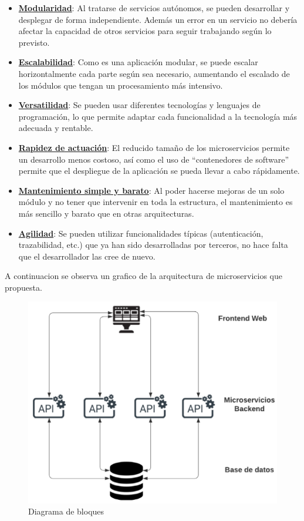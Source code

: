 \begin{itemize}
	\item \textbf{\underline{Modularidad}}: Al tratarse de servicios autónomos, se pueden desarrollar y desplegar de forma independiente. Además un error en un servicio no debería afectar la capacidad de otros servicios para seguir trabajando según lo previsto.
	\item \textbf{\underline{Escalabilidad}}: Como es una aplicación modular, se puede escalar horizontalmente cada parte según sea necesario, aumentando el escalado de los módulos que tengan un procesamiento más intensivo.
	\item \textbf{\underline{Versatilidad}}: Se pueden usar diferentes tecnologías y lenguajes de programación, lo que permite adaptar cada funcionalidad a la tecnología más adecuada y rentable.
	\item \textbf{\underline{Rapidez de actuación}}: El reducido tamaño de los microservicios permite un desarrollo menos costoso, así como el uso de “contenedores de software” permite que el despliegue de la aplicación se pueda llevar a cabo rápidamente.
	\item \textbf{\underline{Mantenimiento simple y barato}}: Al poder hacerse mejoras de un solo módulo y no tener que intervenir en toda la estructura, el mantenimiento es más sencillo y barato que en otras arquitecturas.
	\item \textbf{\underline{Agilidad}}: Se pueden utilizar funcionalidades típicas (autenticación, trazabilidad, etc.) que ya han sido desarrolladas por terceros, no hace falta que el desarrollador las cree de nuevo.\\
\end{itemize}

A continuacion se observa un grafico de la arquitectura de microservicios que propuesta. 

\begin{figure}[H]
	\centering
	\includegraphics[width=\textwidth]{imagenes/resumen_tecnico.png} 
	\caption{Diagrama de bloques}
\end{figure} 

